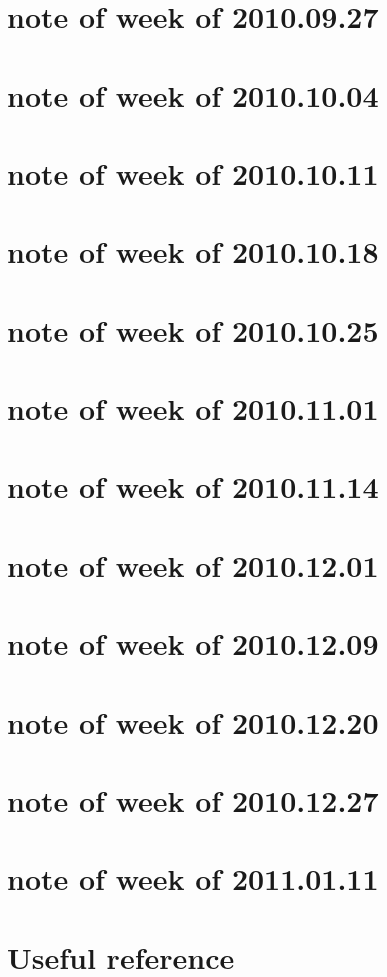\documentclass{article}
\begin{document}
\section{note of week of 2010.09.27}

\section{note of week of 2010.10.04}

\section{note of week of 2010.10.11}

\section{note of week of 2010.10.18}

\section{note of week of 2010.10.25}

\section{note of week of 2010.11.01}

\section{note of week of 2010.11.14}

\section{note of week of 2010.12.01}

\section{note of week of 2010.12.09}

\section{note of week of 2010.12.20}

\section{note of week of 2010.12.27}


\section{note of week of 2011.01.11}



\appendix
\section{Useful reference}

\printindex

%

\end{document}
